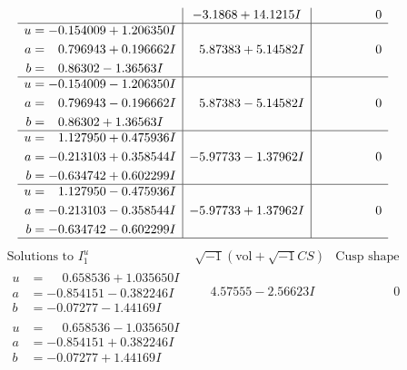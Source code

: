 \documentclass[1p]{elsarticle_modified}
\theoremstyle{definition}
\newcommand{\I}{\sqrt{-1}}
\begin{document}
$$\begin{array}{c|c|c}
 & -3.1868 + 14.1215 I & \phantom{-0.000000 } 0 \\ \hline\begin{aligned}
u &= -0.154009 + 1.206350 I \\
a &= \phantom{-}0.796943 + 0.196662 I \\
b &= \phantom{-}0.86302 - 1.36563 I\end{aligned}
 & \phantom{-}5.87383 + 5.14582 I & \phantom{-0.000000 } 0 \\ \hline\begin{aligned}
u &= -0.154009 - 1.206350 I \\
a &= \phantom{-}0.796943 - 0.196662 I \\
b &= \phantom{-}0.86302 + 1.36563 I\end{aligned}
 & \phantom{-}5.87383 - 5.14582 I & \phantom{-0.000000 } 0 \\ \hline\begin{aligned}
u &= \phantom{-}1.127950 + 0.475936 I \\
a &= -0.213103 + 0.358544 I \\
b &= -0.634742 + 0.602299 I\end{aligned}
 & -5.97733 - 1.37962 I & \phantom{-0.000000 } 0 \\ \hline\begin{aligned}
u &= \phantom{-}1.127950 - 0.475936 I \\
a &= -0.213103 - 0.358544 I \\
b &= -0.634742 - 0.602299 I\end{aligned}
 & -5.97733 + 1.37962 I & \phantom{-0.000000 } 0\\
 \hline 
 \end{array}$$\newpage$$\begin{array}{c|c|c}  
\text{Solutions to }I^u_{1}& \I (\text{vol} + \sqrt{-1}CS) & \text{Cusp shape}\\
 \hline 
\begin{aligned}
u &= \phantom{-}0.658536 + 1.035650 I \\
a &= -0.854151 - 0.382246 I \\
b &= -0.07277 - 1.44169 I\end{aligned}
 & \phantom{-}4.57555 - 2.56623 I & \phantom{-0.000000 } 0 \\ \hline\begin{aligned}
u &= \phantom{-}0.658536 - 1.035650 I \\
a &= -0.854151 + 0.382246 I \\
b &= -0.07277 + 1.44169 I\end{aligned}

\end{array}$$
\end{document}
